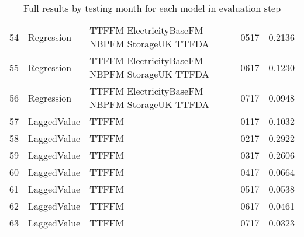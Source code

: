 \begin{table}[ht]
\begin{tabular}{rlllr}
  54 & Regression & TTFFM ElectricityBaseFM NBPFM StorageUK TTFDA & 0517 & 0.2136 \\ 
  55 & Regression & TTFFM ElectricityBaseFM NBPFM StorageUK TTFDA & 0617 & 0.1230 \\ 
  56 & Regression & TTFFM ElectricityBaseFM NBPFM StorageUK TTFDA & 0717 & 0.0948 \\ 
  57 & LaggedValue & TTFFM  & 0117 & 0.1032 \\ 
  58 & LaggedValue & TTFFM  & 0217 & 0.2922 \\ 
  59 & LaggedValue & TTFFM  & 0317 & 0.2606 \\ 
  60 & LaggedValue & TTFFM  & 0417 & 0.0664 \\ 
  61 & LaggedValue & TTFFM  & 0517 & 0.0538 \\ 
  62 & LaggedValue & TTFFM  & 0617 & 0.0461 \\ 
  63 & LaggedValue & TTFFM  & 0717 & 0.0323 \\ 
   \hline
\end{tabular}
\caption{Full results by testing month for each model in evaluation step} 
\label{tab:level.eval.short}
\end{table}
